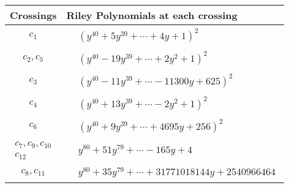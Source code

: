 \documentclass[1p]{elsarticle_modified}
\theoremstyle{definition}
\begin{document}
\begin{tabular}{m{50pt}|m{274pt}}
Crossings & \hspace{64pt}Riley Polynomials at each crossing \\
\hline $$\begin{aligned}c_{1}\end{aligned}$$&$\begin{aligned}
&(y^{40}+5 y^{39}+\cdots+4 y+1)^{2}
\end{aligned}$\\
\hline $$\begin{aligned}c_{2},c_{5}\end{aligned}$$&$\begin{aligned}
&(y^{40}-19 y^{39}+\cdots+2 y^2+1)^{2}
\end{aligned}$\\
\hline $$\begin{aligned}c_{3}\end{aligned}$$&$\begin{aligned}
&(y^{40}-11 y^{39}+\cdots-11300 y+625)^{2}
\end{aligned}$\\
\hline $$\begin{aligned}c_{4}\end{aligned}$$&$\begin{aligned}
&(y^{40}+13 y^{39}+\cdots-2 y^2+1)^{2}
\end{aligned}$\\
\hline $$\begin{aligned}c_{6}\end{aligned}$$&$\begin{aligned}
&(y^{40}+9 y^{39}+\cdots+4695 y+256)^{2}
\end{aligned}$\\
\hline $$\begin{aligned}c_{7},c_{9},c_{10}\\c_{12}\end{aligned}$$&$\begin{aligned}
&y^{80}+51 y^{79}+\cdots-165 y+4
\end{aligned}$\\
\hline $$\begin{aligned}c_{8},c_{11}\end{aligned}$$&$\begin{aligned}
&y^{80}+35 y^{79}+\cdots+31771018144 y+2540966464
\end{aligned}$\\
\hline
\end{tabular}\\~\\
\end{document}
